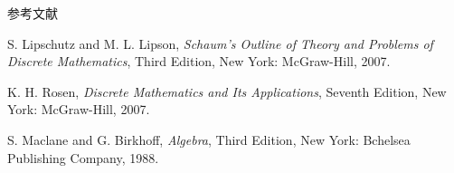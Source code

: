 参考文献
%

\begin{thebibliography}{99}
	
	
	S. Lipschutz and M. L. Lipson, \textit{Schaum's Outline of Theory and Problems of Discrete Mathematics}, Third Edition, New York: McGraw-Hill, 2007.
	
	K. H. Rosen, \textit{Discrete Mathematics and Its Applications}, Seventh Edition, New York: McGraw-Hill, 2007.
	
	S. Maclane and G. Birkhoff, \textit{Algebra}, Third Edition, New York: Bchelsea Publishing Company, 1988.
\end{thebibliography}
